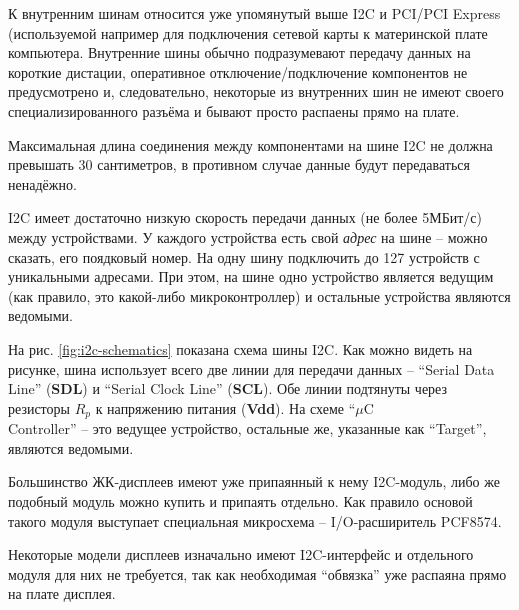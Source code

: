 \documentclass[../sparc.tex]{subfiles}
\begin{document}
К внутренним шинам относится уже упомянутый выше \gls{I2C} и \gls{PCI}/PCI
Express (используемой например для подключения сетевой карты к материнской плате
компьютера.  Внутренние шины обычно подразумевают передачу данных на короткие
дистации, оперативное отключение/подключение компонентов не предусмотрено и,
следовательно, некоторые из внутренних шин не имеют своего специализированного
разъёма и бывают просто распаены прямо на плате.

Максимальная длина соединения между компонентами на шине \gls{I2C} не должна
превышать 30 сантиметров, в противном случае данные будут передаваться
ненадёжно.

\gls{I2C} имеет достаточно низкую скорость передачи данных (не более 5МБит/с)
между устройствами.  У каждого устройства есть свой \textit{адрес} на шине --
можно сказать, его поядковый номер.  На одну шину подключить до 127 устройств с
уникальными адресами.  При этом, на шине одно устройство является ведущим (как
правило, это какой-либо микроконтроллер) и остальные устройства являются
ведомыми.

На рис. \ref{fig:i2c-schematics} показана схема шины \gls{I2C}. Как можно видеть
на рисунке, шина использует всего две линии для передачи данных -- ``Serial Data
Line'' (\textbf{SDL}) и ``Serial Clock Line'' (\textbf{SCL}). Обе линии
подтянуты через резисторы \textbf{$R_p$} к напряжению питания (\textbf{Vdd}). На
схеме ``$\mu$C\\Controller'' -- это ведущее устройство, остальные же, указанные как
``Target'', являются ведомыми.

Большинство ЖК-дисплеев имеют уже припаянный к нему \gls{I2C}-модуль, либо же
подобный модуль можно купить и припаять отдельно.  Как правило основой такого
модуля выступает специальная микросхема -- \gls{I/O}-расширитель PCF8574.

Некоторые модели дисплеев изначально имеют I2C-интерфейс и отдельного модуля для
них не требуется, так как необходимая ``обвязка'' уже распаяна прямо на плате
дисплея.
\end{document}
